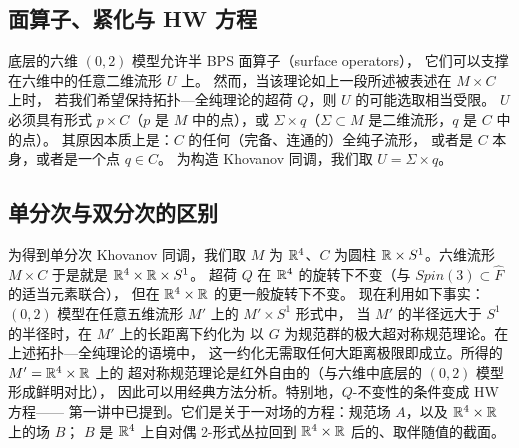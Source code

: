 
\subsection{面算子、紧化与 HW 方程}

底层的六维 $(0,2)$ 模型允许半 BPS 面算子（surface operators），
它们可以支撑在六维中的任意二维流形 $U$ 上。
然而，当该理论如上一段所述被表述在 $M\times C$ 上时，
若我们希望保持拓扑—全纯理论的超荷 $Q$，则 $U$ 的可能选取相当受限。
$U$ 必须具有形式 $p\times C$（$p$ 是 $M$ 中的点），或
$\Sigma\times q$（$\Sigma\subset M$ 是二维流形，$q$ 是 $C$ 中的点）。
其原因本质上是：$C$ 的任何（完备、连通的）全纯子流形，
或者是 $C$ 本身，或者是一个点 $q\in C$。
为构造 Khovanov 同调，我们取 $U=\Sigma\times q$。


\subsection{单分次与双分次的区别}

为得到单分次 Khovanov 同调，我们取 $M$ 为 $\mathbb{R}^4$、$C$ 为圆柱
$\mathbb{R}\times S^1$。六维流形 $M\times C$ 于是就是 $\mathbb{R}^4\times\mathbb{R}\times S^1$。
超荷 $Q$ 在 $\mathbb{R}^4$ 的旋转下不变（与 $Spin(3)\subset\widehat{F}$ 的适当元素联合），
但在 $\mathbb{R}^4\times\mathbb{R}$ 的更一般旋转下不变。
现在利用如下事实：$(0,2)$ 模型在任意五维流形 $M'$ 上的 $M'\times S^1$ 形式中，
当 $M'$ 的半径远大于 $S^1$ 的半径时，在 $M'$ 上的长距离下约化为
以 $G$ 为规范群的极大超对称规范理论。在上述拓扑—全纯理论的语境中，
这一约化无需取任何大距离极限即成立。所得的 $M'=\mathbb{R}^4\times\mathbb{R}$ 上的
超对称规范理论是红外自由的（与六维中底层的 $(0,2)$ 模型形成鲜明对比），
因此可以用经典方法分析。特别地，$Q$-不变性的条件变成 HW 方程——
第一讲中已提到。它们是关于一对场的方程：规范场 $A$，以及 $\mathbb{R}^4\times\mathbb{R}$ 上的场 $B$；
$B$ 是 $\mathbb{R}^4$ 上自对偶 2-形式丛拉回到 $\mathbb{R}^4\times\mathbb{R}$ 后的、取伴随值的截面。

